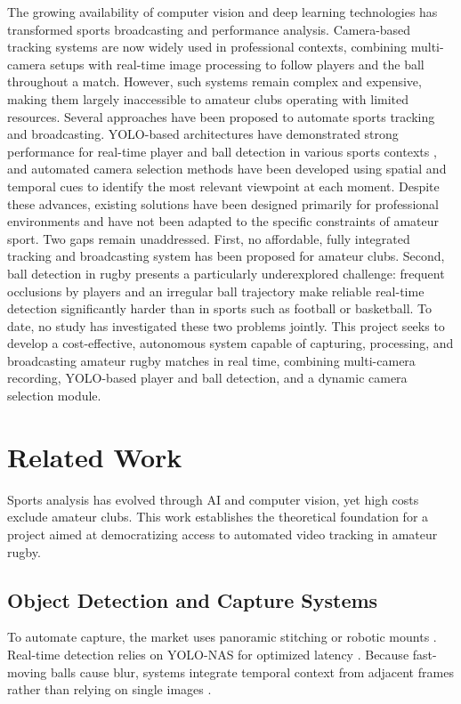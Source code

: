 \documentclass[conference]{IEEEtran}
\begin{document}
The growing availability of computer vision and deep learning technologies has transformed sports broadcasting and performance analysis. Camera-based tracking systems are now widely used in professional contexts, combining multi-camera setups with real-time image processing to follow players and the ball throughout a match. However, such systems remain complex and expensive, making them largely inaccessible to amateur clubs operating with limited resources.
Several approaches have been proposed to automate sports tracking and broadcasting. YOLO-based architectures have demonstrated strong performance for real-time player and ball detection in various sports contexts \cite{ultralytics_yolov8}, and automated camera selection methods have been developed using spatial and temporal cues to identify the most relevant viewpoint at each moment. Despite these advances, existing solutions have been designed primarily for professional environments and have not been adapted to the specific constraints of amateur sport.
Two gaps remain unaddressed. First, no affordable, fully integrated tracking and broadcasting system has been proposed for amateur clubs. Second, ball detection in rugby presents a particularly underexplored challenge: frequent occlusions by players and an irregular ball trajectory make reliable real-time detection significantly harder than in sports such as football or basketball. To date, no study has investigated these two problems jointly.
This project seeks to develop a cost-effective, autonomous system capable of capturing, processing, and broadcasting amateur rugby matches in real time, combining multi-camera recording, YOLO-based player and ball detection, and a dynamic camera selection module. 

\newpage
\section{Related Work}

Sports analysis has evolved through AI and computer vision, yet high costs exclude amateur clubs. This work establishes the theoretical foundation for a project aimed at democratizing access to automated video tracking in amateur rugby.

\subsection{Object Detection and Capture Systems}
To automate capture, the market uses panoramic stitching \cite{taxbol_computer-implemented_2022} or robotic mounts \cite{linderoth_system_2020}. Real-time detection relies on YOLO-NAS for optimized latency \cite{biro_predictive_2023}. Because fast-moving balls cause blur, systems integrate temporal context from adjacent frames rather than relying on single images \cite{xu_yolo-based_2025, biro_predictive_2023}.
\end{document}
